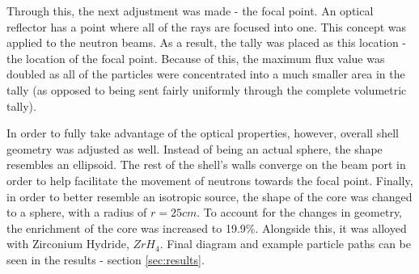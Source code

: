 Through this, the next adjustment was made - the focal point. An optical reflector has a point where all of the rays are focused into one. This concept was applied to the neutron beams. As a result, the tally was placed as this location - the location of the focal point. Because of this, the maximum flux value was doubled as all of the particles were concentrated into a much smaller area in the tally (as opposed to being sent fairly uniformly through the complete volumetric tally).

In order to fully take advantage of the optical properties, however, overall shell geometry was adjusted as well. Instead of being an actual sphere, the shape resembles an ellipsoid. The rest of the shell's walls converge on the beam port in order to help facilitate the movement of neutrons towards the focal point. Finally, in order to better resemble an isotropic source, the shape of the core was changed to a sphere, with a radius of $r=25cm$. To account for the changes in geometry, the enrichment of the core was increased to 19.9\%. Alongside this, it was alloyed with Zirconium Hydride, $ZrH_4$. Final diagram and example particle paths can be seen in the results - section \ref{sec:results}.

